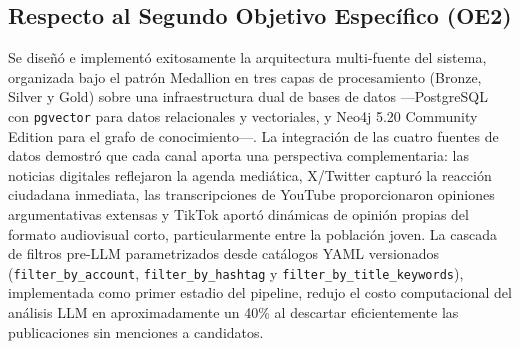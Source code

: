 \documentclass[listof=nochaptergap,12pt,times,authoryear]{report}
\begin{document}
\subsection*{Respecto al Segundo Objetivo Específico (OE2)}
Se diseñó e implementó exitosamente la arquitectura multi-fuente del sistema,
organizada bajo el patrón Medallion en tres capas de procesamiento (Bronze, Silver
y Gold) sobre una infraestructura dual de bases de datos —PostgreSQL con
\texttt{pgvector} para datos relacionales y vectoriales, y Neo4j 5.20 Community
Edition para el grafo de conocimiento—. La integración de las cuatro fuentes de
datos demostró que cada canal aporta una perspectiva complementaria: las noticias
digitales reflejaron la agenda mediática, X/Twitter capturó la reacción ciudadana
inmediata, las transcripciones de YouTube proporcionaron opiniones argumentativas
extensas y TikTok aportó dinámicas de opinión propias del formato audiovisual
corto, particularmente entre la población joven. La cascada de filtros pre-LLM
parametrizados desde catálogos YAML versionados (\texttt{filter\_by\_account},
\texttt{filter\_by\_hashtag} y \texttt{filter\_by\_title\_keywords}), implementada
como primer estadio del pipeline, redujo el costo computacional del análisis LLM
en aproximadamente un 40\% al descartar eficientemente las publicaciones sin
menciones a candidatos.
\end{document}
